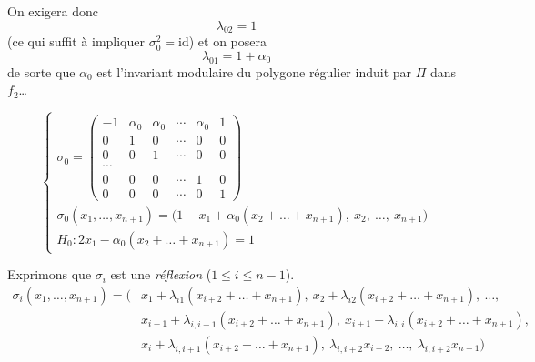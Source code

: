 \documentclass[11pt,a4paper]{article}
\begin{document}

On exigera donc
\[
\lambda_{02} = 1
\]
(ce qui suffit à impliquer $\sigma_0^2=\mathrm{id}$) et on posera
\[
\boxed{\ \lambda_{01} = 1+\alpha_0\ }
\]
de sorte que $\alpha_0$ est l'invariant modulaire du polygone régulier induit par $\Pi$ dans $f_2$\ldots

\[
\begin{cases}
\sigma_0 =
\begin{pmatrix}
-1 & \alpha_0 & \alpha_0 & \cdots & \alpha_0 & 1 \\
0 & 1 & 0 & \cdots & 0 & 0 \\
0 & 0 & 1 & \cdots & 0 & 0 \\
\cdots & & & & & \\
0 & 0 & 0 & \cdots & 1 & 0 \\
0 & 0 & 0 & \cdots & 0 & 1
\end{pmatrix} \\[2ex]
\sigma_0(x_1,\dots,x_{n+1}) = \bigl(1-x_1+\alpha_0(x_2+\dots+x_{n+1}),\ x_2,\ \dots,\ x_{n+1}\bigr) \\[1ex]
H_0 : 2x_1 - \alpha_0(x_2+\dots+x_{n+1}) = 1
\end{cases}
\]

Exprimons que $\sigma_i$ est une \emph{réflexion} ($1\leq i\leq n-1$).
\[
\begin{aligned}
\sigma_i(x_1,\dots,x_{n+1}) = \bigl(&x_1+\lambda_{i1}(x_{i+2}+\dots+x_{n+1}),\ x_2+\lambda_{i2}(x_{i+2}+\dots+x_{n+1}),\ \dots, \\
&x_{i-1}+\lambda_{i,i-1}(x_{i+2}+\dots+x_{n+1}),\ x_{i+1}+\lambda_{i,i}(x_{i+2}+\dots+x_{n+1}), \\
&x_i+\lambda_{i,i+1}(x_{i+2}+\dots+x_{n+1}),\ \lambda_{i,i+2}x_{i+2},\ \dots,\ \lambda_{i,i+2}x_{n+1}\bigr)
\end{aligned}
\]
\end{document}
